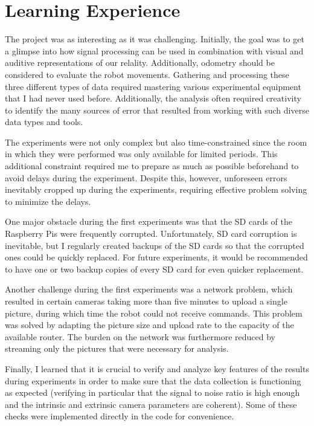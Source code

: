 
\section{Learning Experience}

\setlength{\parskip}{1em}
The project was as interesting as it was challenging. Initially, the goal was to get a glimpse into how signal processing can be used in combination with visual and auditive representations of our relality. Additionally, odometry should be considered to evaluate the robot movements. Gathering and processing these three different types of data required mastering various experimental equipment that I had never used before. Additionally, the analysis often required creativity to identify the many sources of error that resulted from working with such diverse data types and tools.

The experiments were not only complex but also time-constrained since the room in which they were performed was only available for limited periods. 
This additional constraint required me to prepare as much as possible beforehand to avoid delays during the experiment.
Despite this, however, unforeseen errors inevitably cropped up during the experiments, requiring effective problem solving to minimize the delays. 

One major obstacle during the first experiments was that the SD cards of the Raspberry Pis were frequently corrupted. Unfortunately, SD card corruption is inevitable, but I regularly created backups of the SD cards so that the corrupted ones could be quickly replaced. For future experiments, it would be recommended to have one or two backup copies of every SD card for even quicker replacement.

Another challenge during the first experiments was a network problem, which resulted in certain cameras taking more than five minutes to upload a single picture, during which time the robot could not receive commands. This problem was solved by adapting the picture size and upload rate to the capacity of the available router. 
The burden on the network was furthermore reduced by streaming only the pictures that were necessary for analysis. 

Finally, I learned that it is crucial to verify and analyze key features of the results during experiments in order to make sure that the data collection is functioning as expected (verifying in particular that the signal to noise ratio is high enough and the intrinsic and extrinsic camera parameters are coherent). Some of these checks were implemented directly in the code for convenience. 

